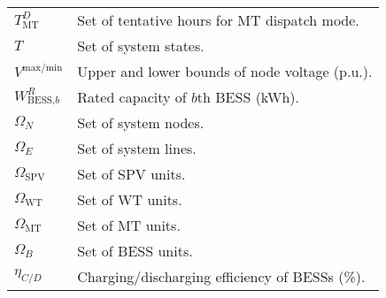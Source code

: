 \documentclass[journal]{IEEEtran}
\begin{document}
\begin{supertabular}[l]{p{35pt} p{209pt}}
		$T_{\text{MT}}^{D}$ & Set of tentative hours for MT dispatch mode. \\		
		$T$ & Set of system states. \\
		$V_{{}}^{\text{max/min}}$ & Upper and lower bounds of node voltage (p.u.). \\					
		$W_{\text{BESS}\text{,}b}^{R}$ & Rated capacity of $b$th BESS (kWh). \\	
		${{\Omega }_{N}}$ & Set of system nodes. \\
		${{\Omega }_{E}}$ & Set of system lines. \\
		${{\Omega }_{\text{SPV}}}$ & Set of SPV units. \\
		${{\Omega }_{\text{WT}}}$ & Set of WT units. \\
		${{\Omega }_{\text{MT}}}$ & Set of MT units. \\
		${{\Omega }_{B}}$ & Set of BESS units. \\
		${{\eta }_{C/D}}$ & Charging/discharging efficiency of BESSs (\%). \\[-0.4cm]	
	\end{supertabular}
\end{document}
